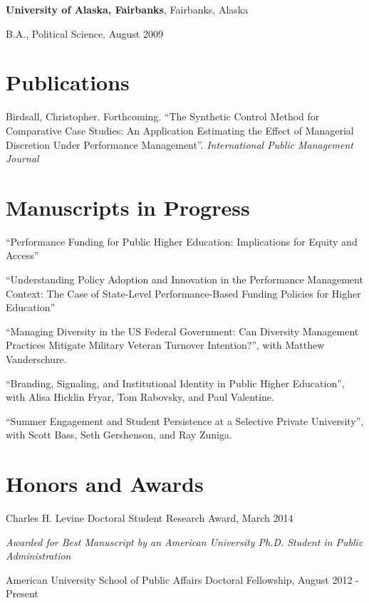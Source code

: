 \documentclass[margin,line]{res}
\newenvironment{list1}{
  \begin{list}{\ding{113}}{%
      \setlength{\itemsep}{0in}
      \setlength{\parsep}{0in} \setlength{\parskip}{0in}
      \setlength{\topsep}{0in} \setlength{\partopsep}{0in} 
      \setlength{\leftmargin}{0.17in}}}{\end{list}}
\begin{document}
\begin{resume}
{\bf University of Alaska, Fairbanks}, Fairbanks, Alaska\\
\vspace*{-.1in}
\begin{list1}
\item[] B.A., Political Science,  August 2009
\end{list1}

\section{\sc Publications}
Birdsall, Christopher. Forthcoming. ``The Synthetic Control Method for Comparative Case Studies: An Application Estimating the Effect of Managerial Discretion Under Performance Management''. {\em International Public Management Journal}



\section{\sc Manuscripts in Progress}
``Performance Funding for Public Higher Education: Implications for Equity and Access''

``Understanding Policy Adoption and Innovation in the Performance Management Context: The Case of State-Level Performance-Based Funding Policies for Higher Education''


``Managing Diversity in the US Federal Government: Can Diversity Management Practices Mitigate Military Veteran Turnover Intention?'', with Matthew Vanderschure.

``Branding, Signaling, and Institutional Identity in Public Higher Education'', with Alisa Hicklin Fryar, Tom Rabovsky, and Paul Valentine.


``Summer Engagement and Student Persistence at a Selective Private University'', with Scott Bass, Seth Gershenson, and Ray Zuniga.


\section{\sc Honors and Awards} 
Charles H. Levine Doctoral Student Research Award, March 2014
\begin{list1}
\item[]\emph{Awarded for Best Manuscript by an American University Ph.D. Student in Public Administration}
\end{list1}

American University School of Public Affairs Doctoral Fellowship, August 2012 - Present



\end{resume}
\end{document}
